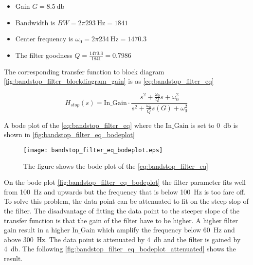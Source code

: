 \begin{itemize}
\item Gain $G = \SI{8.5}{\decibel}$
\item Bandwidth is $BW = 2\pi \SI{293}{\hertz} = 1841$
\item Center frequency is $\omega_0 = 2\pi \SI{234}{\hertz} = 1470.3$
\item The filter goodness $Q = \frac{1470.3}{1841} = 0.7986$
\end{itemize}

The corresponding transfer function to block diagram \autoref{fig:bandstop_filter_blockdiagram_gain} is as \autoref{eq:bandstop_filter_eq}

\begin{equation}\label{eq:bandstop_filter_eq}
H_{stop}(s) = \text{In_Gain} \cdot \frac{s^2+\frac{\omega_0}{Q}s+\omega_0^2}{s^2+\frac{\omega_0}{Q}s(G)+\omega_0^2}
\end{equation}

    \startexplain
    \stopexplain


A bode plot of the \autoref{eq:bandstop_filter_eq} where the $\text{In_Gain}$ is set to \SI{0}{\decibel} is shown in \autoref{fig:bandstop_filter_eq_bodeplot}



\begin{figure}[H]
	\centering
	\texttt{[image: bandstop\_filter\_eq\_bodeplot.eps]}
	\caption{The figure shows the bode plot of the \autoref{eq:bandstop_filter_eq}}
		\label{fig:bandstop_filter_eq_bodeplot}
\end{figure}

On the bode plot  \autoref{fig:bandstop_filter_eq_bodeplot} the filter parameter fits well from \SI{100}{\hertz} and upwards but the frequency that is below \SI{100}{\hertz} is too fare off. To solve this problem, the data point can be attenuated to fit on the steep slop of the filter. The disadvantage of fitting the data point to the steeper slope of the transfer function is that the gain of the filter have to be higher. A higher filter gain result in a higher $\text{In_Gain}$ which amplify the frequency below \SI{60}{\hertz} and above \SI{300}{\hertz}. The data point is attenuated by \SI{4}{\decibel} and the filter is gained by \SI{4}{\decibel}. The following \autoref{fig:bandstop_filter_eq_bodeplot_attenuated} shows the result.

